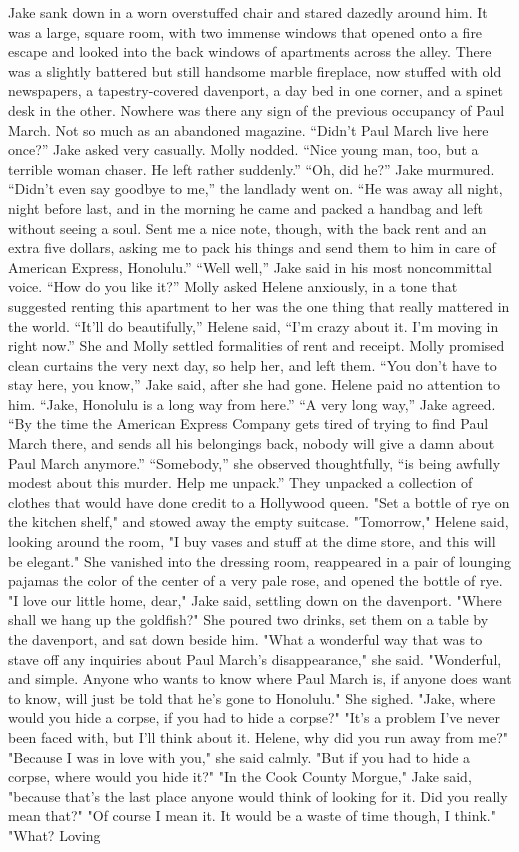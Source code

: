 \documentclass{novel}
\begin{document}
Jake sank down in a worn overstuffed chair and stared dazedly around him. It was a large, square room, with two immense windows that opened onto a fire escape and looked into the back windows of apartments across the alley. There was a slightly battered but still handsome marble fireplace, now stuffed with old newspapers, a tapestry-covered davenport, a day bed in one corner, and a spinet desk in the other. Nowhere was there any sign of the previous occupancy of Paul March. Not so much as an abandoned magazine. “Didn’t Paul March live here once?” Jake asked very casually. Molly nodded. “Nice young man, too, but a terrible woman chaser. He left rather suddenly.” “Oh, did he?” Jake murmured. “Didn’t even say goodbye to me,” the landlady went on. “He was away all night, night before last, and in the morning he came and packed a handbag and left without seeing a soul. Sent me a nice note, though, with the back rent and an extra five dollars, asking me to pack his things and send them to him in care of American Express, Honolulu.” “Well well,” Jake said in his most noncommittal voice. “How do you like it?” Molly asked Helene anxiously, in a tone that suggested renting this apartment to her was the one thing that really mattered in the world. “It’ll do beautifully,” Helene said, “I’m crazy about it. I’m moving in right now.” She and Molly settled formalities of rent and receipt. Molly promised clean curtains the very next day, so help her, and left them. “You don’t have to stay here, you know,” Jake said, after she had gone. Helene paid no attention to him. “Jake, Honolulu is a long way from here.” “A very long way,” Jake agreed. “By the time the American Express Company gets tired of trying to find Paul March there, and sends all his belongings back, nobody will give a damn about Paul March anymore.” “Somebody,” she observed thoughtfully, “is being awfully modest about this murder. Help me unpack.” They unpacked a collection of clothes that would have done credit to a Hollywood queen. "Set a bottle of rye on the kitchen shelf," and stowed away the empty suitcase. "Tomorrow," Helene said, looking around the room, "I buy vases and stuff at the dime store, and this will be elegant." She vanished into the dressing room, reappeared in a pair of lounging pajamas the color of the center of a very pale rose, and opened the bottle of rye. "I love our little home, dear," Jake said, settling down on the davenport. "Where shall we hang up the goldfish?" She poured two drinks, set them on a table by the davenport, and sat down beside him. "What a wonderful way that was to stave off any inquiries about Paul March's disappearance," she said. "Wonderful, and simple. Anyone who wants to know where Paul March is, if anyone does want to know, will just be told that he's gone to Honolulu." She sighed. "Jake, where would you hide a corpse, if you had to hide a corpse?" "It's a problem I've never been faced with, but I'll think about it. Helene, why did you run away from me?" "Because I was in love with you," she said calmly. "But if you had to hide a corpse, where would you hide it?" "In the Cook County Morgue," Jake said, "because that's the last place anyone would think of looking for it. Did you really mean that?" "Of course I mean it. It would be a waste of time though, I think." "What? Loving 
\end{document}
